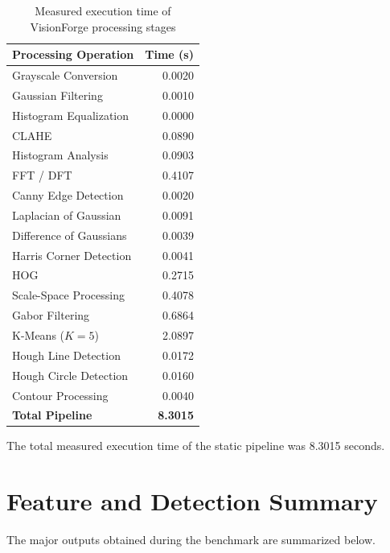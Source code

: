 \documentclass[11pt,a4paper]{article}
\begin{document}
\begin{table}[H]
\centering
\caption{Measured execution time of VisionForge processing stages}
\label{tab:benchmark}
\begin{tabular}{lr}
\toprule
\textbf{Processing Operation} & \textbf{Time (s)}\\
\midrule
Grayscale Conversion & 0.0020\\
Gaussian Filtering & 0.0010\\
Histogram Equalization & 0.0000\\
CLAHE & 0.0890\\
Histogram Analysis & 0.0903\\
FFT / DFT & 0.4107\\
Canny Edge Detection & 0.0020\\
Laplacian of Gaussian & 0.0091\\
Difference of Gaussians & 0.0039\\
Harris Corner Detection & 0.0041\\
HOG & 0.2715\\
Scale-Space Processing & 0.4078\\
Gabor Filtering & 0.6864\\
K-Means ($K=5$) & 2.0897\\
Hough Line Detection & 0.0172\\
Hough Circle Detection & 0.0160\\
Contour Processing & 0.0040\\
\midrule
\textbf{Total Pipeline} & \textbf{8.3015}\\
\bottomrule
\end{tabular}
\end{table}

The total measured execution time of the static pipeline was 8.3015 seconds.


\section{Feature and Detection Summary}

The major outputs obtained during the benchmark are summarized below.
\end{document}
